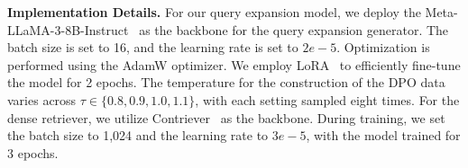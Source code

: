 \textbf{Implementation Details.} 
For our query expansion model, we deploy the Meta-LLaMA-3-8B-Instruct~\cite{llama3modelcard} as the backbone for the query expansion generator. The batch size is set to 16, and the learning rate is set to $2e-5$. Optimization is performed using the AdamW optimizer. We employ LoRA~\cite{hu2022lora} to efficiently fine-tune the model for 2 epochs. The temperature for the construction of the DPO data varies across $\tau \in \{0.8, 0.9, 1.0, 1.1\}$, with each setting sampled eight times. For the dense retriever, we utilize Contriever~\cite{izacard2021unsupervised} as the backbone. During training, we set the batch size to 1,024 and the learning rate to $3e-5$, with the model trained for 3 epochs.
